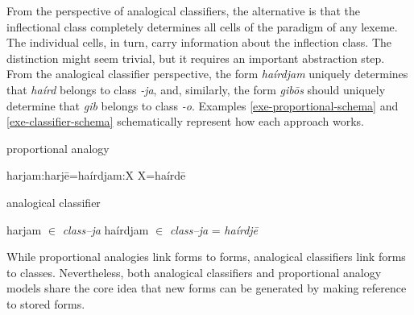 From the perspective of analogical classifiers, the alternative is that the inflectional class completely determines all cells of the paradigm of any lexeme. The individual cells, in turn, carry information about the inflection class. The distinction might seem trivial, but it requires an important abstraction step. From the analogical classifier perspective, the form \textit{haírdjam} uniquely determines that \textit{haírd} belongs to class \textit{-ja}, and, similarly, the form \textit{gibōs} should uniquely determine that \textit{gib} belongs to class \textit{-o}. Examples \ref{exe-proportional-schema} and \ref{exe-classifier-schema} schematically represent how each approach works.

\begin{exe}
    \ex \label{exe-proportional-schema} proportional analogy
    \begin{xlist}
        \ex harjam:harjē=haírdjam:X
        \ex X=haírdē
    \end{xlist}

    \ex \label{exe-classifier-schema} analogical classifier
    \begin{xlist}
        \ex harjam $\in$ \textit{class--ja}
        \ex haírdjam $\in$ \textit{class--ja}
         = \textit{haírdjē}
    \end{xlist}
\end{exe}


While proportional analogies link forms to forms, analogical classifiers link forms to classes. Nevertheless, both analogical classifiers and proportional analogy models share the core idea that new forms can be generated by making reference to stored forms.

